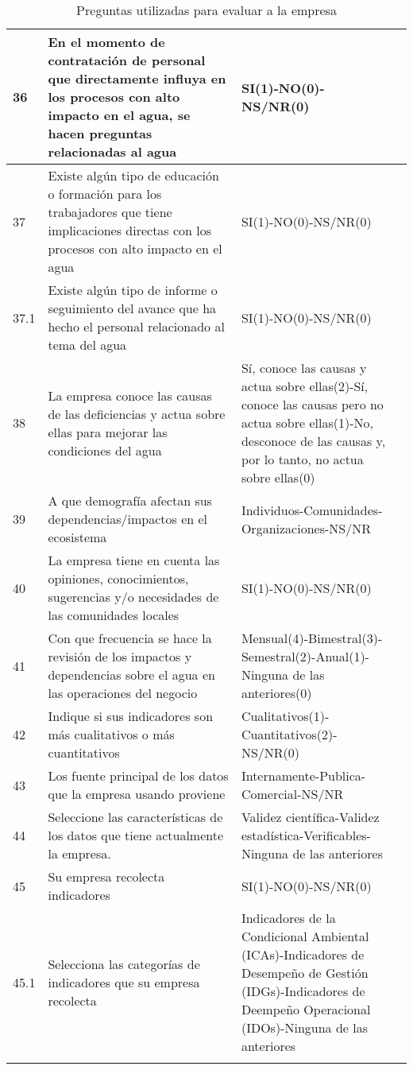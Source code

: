 \begin{longtable}{p{0.75cm}|p{6cm}|p{6cm}|p{2cm}}
\hline
36 & En el momento de contratación de personal que directamente influya en los procesos con alto impacto en el agua, se hacen preguntas relacionadas al agua & SI(1)-NO(0)-NS/NR(0) & \parencite{iso-2004} \\
\hline
37 & Existe algún tipo de educación o formación para los trabajadores que tiene implicaciones directas con los procesos con alto impacto en el agua & SI(1)-NO(0)-NS/NR(0) & \parencite{iso-2004} \\
\hline
37.1 & Existe algún tipo de informe o seguimiento del avance que ha hecho el personal relacionado al tema del agua & SI(1)-NO(0)-NS/NR(0) & \parencite{iso-2004} \\
\hline
38 & La empresa conoce las causas de las deficiencias y actua sobre ellas para mejorar las condiciones del agua & Sí, conoce las causas y actua sobre ellas(2)-Sí, conoce las causas pero no actua sobre ellas(1)-No, desconoce de las causas y, por lo tanto, no actua sobre ellas(0) & \parencite{iso-2004} \\
\hline
39 & A que demografía afectan sus dependencias/impactos en el ecosistema & Individuos-Comunidades-Organizaciones-NS/NR & \parencite{capitals-coalition-2021} \\
\hline
40 & La empresa tiene en cuenta las opiniones, conocimientos, sugerencias y/o necesidades de las comunidades locales  & SI(1)-NO(0)-NS/NR(0) & \parencite{ceres-2023A} \\
\hline
41 & Con que frecuencia se hace la revisión de los impactos y dependencias sobre el agua en las operaciones del negocio & Mensual(4)-Bimestral(3)-Semestral(2)-Anual(1)-Ninguna de las anteriores(0) & \parencite{iso-1999} \\
\hline
42 & Indique si sus indicadores son más cualitativos o  más cuantitativos & Cualitativos(1)-Cuantitativos(2)-NS/NR(0) & \parencite{capitals-coalition-2021} \\
\hline
43 & Los fuente principal de los datos que la empresa usando proviene & Internamente-Publica-Comercial-NS/NR & \parencite{capitals-coalition-2021} \\
\hline
44 & Seleccione las características de los datos que tiene actualmente la empresa. & Validez científica-Validez estadística-Verificables-Ninguna de las anteriores & \parencite{iso-1999} \\
\hline
45 & Su empresa recolecta indicadores & SI(1)-NO(0)-NS/NR(0) &  \\
\hline
45.1 & Selecciona las categorías de indicadores que su empresa recolecta & Indicadores de la Condicional Ambiental (ICAs)-Indicadores de Desempeño de Gestión (IDGs)-Indicadores de Deempeño Operacional (IDOs)-Ninguna de las anteriores & \parencite{iso-1999} \\
\hline
    
\caption{Preguntas utilizadas para evaluar a la empresa}
\label{tab:preguntas}
\end{longtable}
    
